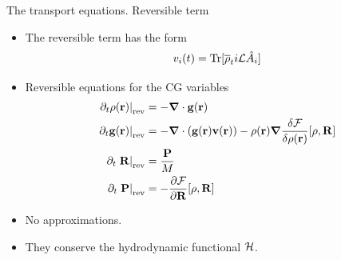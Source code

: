 \documentclass{beamer}
\begin{document}

\begin{frame}{The transport equations. Reversible term}
  \begin{itemize}
    \item The reversible term has the form
\begin{equation}
  v_i(t) = {\rm Tr}[\overline{\rho}_t  i{\cal L} \hat{A}_i]
  \nonumber
\end{equation}
\item Reversible equations for the CG variables
\begin{align}
\left.  \partial_t\rho({\bf r})\right|_{\rm rev}&=-\boldsymbol{\nabla}\cdot{\bf g}({\bf r})
\nonumber\\
\left.  \partial_t{\bf g}({\bf r})\right|_{\rm rev}&=-\boldsymbol{\nabla}\cdot\left({\bf g}({\bf r}){\bf v}({\bf r})\right)
-\rho({\bf r})\boldsymbol{\nabla} \frac{\delta {\cal F}}{\delta\rho({\bf r})}[\rho,{\bf R}]
\nonumber\\
\partial_t\left. {\bf R}\right|_{\rm rev}&=\frac{\bf P}{M}
\nonumber\\
\partial_t\left.{\bf P}\right|_{\rm rev}&=-\frac{\partial {\cal F}}{\partial {\bf R}}[\rho,{\bf R}]
\nonumber
\end{align}
  \item No approximations.
  \item They conserve the hydrodynamic functional ${\cal H}$.
\end{itemize}
\end{frame}
\end{document}
